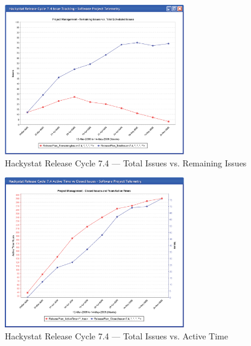 \begin{figure}[p]
  \center
  \includegraphics[width=0.70\textwidth]{figures/CSDL-Issue740}
  \caption{Hackystat Release Cycle 7.4 --- Total Issues vs. Remaining Issues} 
  \label{fig:CSDL-Issue740}
\end{figure}

\begin{figure}[p]
  \center
  \includegraphics[width=0.70\textwidth]{figures/CSDL-IssueActiveTime740}
  \caption{Hackystat Release Cycle 7.4 --- Total Issues vs. Active Time} 
  \label{fig:CSDL-IssueActiveTime740}
\end{figure}

 









\clearpage

